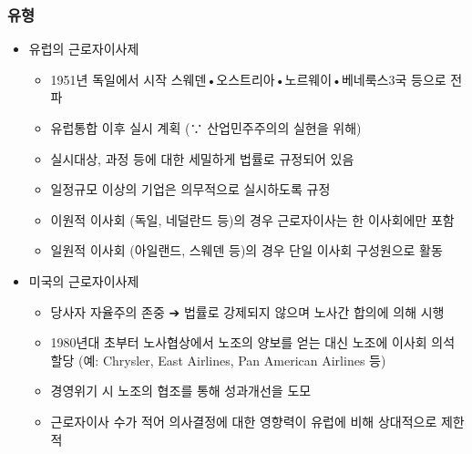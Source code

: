 \documentclass[aspectratio=169,xcolor=dvipsnames,handout]{beamer}
\begin{document}
\begin{frame}[allowframebreaks]
    \frametitle{유형}
    \begin{itemize}[<+->]
        \item 유럽의 근로자이사제
        \begin{itemize}[<+->]
            \item 1951년 독일에서 시작 스웨덴•오스트리아•노르웨이•베네룩스3국 등으로 전파
            \item 유럽통합 이후 실시 계획 (∵ 산업민주주의의 실현을 위해)
            \item 실시대상, 과정 등에 대한 세밀하게 법률로 규정되어 있음
            \item 일정규모 이상의 기업은 의무적으로 실시하도록 규정
            \item 이원적 이사회 (독일, 네덜란드 등)의 경우 근로자이사는 한 이사회에만 포함
            \item 일원적 이사회 (아일랜드, 스웨덴 등)의 경우 단일 이사회 구성원으로 활동
        \end{itemize}
    \framebreak\relax
        \item 미국의 근로자이사제
        \begin{itemize}[<+->]
            \item 당사자 자율주의 존중 ➔ 법률로 강제되지 않으며 노사간 합의에 의해 시행
            \item 1980년대 초부터 노사협상에서 노조의 양보를 얻는 대신 노조에 이사회 의석 할당 (예: Chrysler, East Airlines, Pan American Airlines 등)
            \item 경영위기 시 노조의 협조를 통해 성과개선을 도모
            \item 근로자이사 수가 적어 의사결정에 대한 영향력이 유럽에 비해 상대적으로 제한적
        \end{itemize}
    \end{itemize}
\end{frame}
\end{document}
